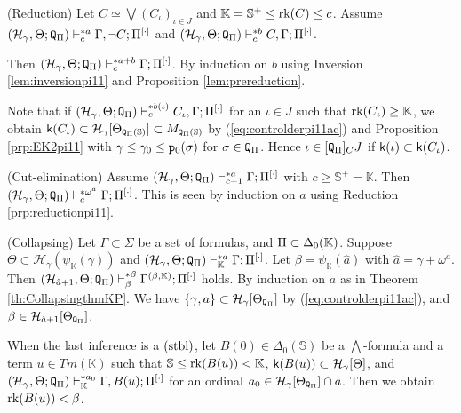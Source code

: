 \documentclass{article}
\newcommand{\mS}{\mathbb{S}}
\newcommand{\mK}{\mathbb{K}}
\begin{document}
\bprp\label{prp:reductionpi11}{\rm (Reduction)}
Let $C\simeq\bigvee(C_{\iota})_{\iota\in J}$ and
$\mK=\mS^{+}\leq\mbox{{\rm rk}}(C)\leq c$.
Assume
$(\mathcal{H}_{\gamma},\Theta;{\tt Q}_{\Pi})\vdash^{* a}_{c}\Gamma,\lnot C;\Pi^{[\cdot]}$
and
$(\mathcal{H}_{\gamma},\Theta;{\tt Q}_{\Pi})\vdash^{* b}_{c}C,\Gamma;\Pi^{[\cdot]}$.

Then
$(\mathcal{H}_{\gamma},\Theta;{\tt Q}_{\Pi})\vdash^{* a+b}_{c}\Gamma;\Pi^{[\cdot]}$.
\eprp
\bprf
By induction on $b$ using
Inversion \ref{lem:inversionpi11} and Proposition \ref{lem:prereduction}.

Note that if $(\mathcal{H}_{\gamma},\Theta;{\tt Q}_{\Pi})\vdash^{* b(\iota)}_{c}C_{\iota},\Gamma;\Pi^{[\cdot]}$ for an $\iota\in J$ such that $\rk(C_{\iota})\geq\mK$,
we obtain 
$\sfk(C_{\iota})\subset\calh_{\gam}[\Tht_{{\tt Q}_{\Pi}(\mS)}]\subset M_{{\tt Q}_{\Pi}(\mS)}$ by (\ref{eq:controlderpi11ac}) and Proposition \ref{prp:EK2pi11}
with $\gamma\leq\gamma_{0}\leq {\tt p}_{0}(\sigma)$ for $\sigma\in{\tt Q}_{\Pi}$.
Hence 
$\iota\in[{\tt Q}_{\Pi}]_{C}J$ if ${\sf k}(\iota)\subset{\sf k}(C_{\iota})$.
\eprf



\bprp\label{lem:predcepi11*}{\rm (Cut-elimination)}
Assume
$(\mathcal{H}_{\gamma},\Theta;{\tt Q}_{\Pi})\vdash^{* a}_{c+1}\Gamma;\Pi^{[\cdot]}$
with $c\geq\mS^{+}=\mK$.
Then $(\mathcal{H}_{\gamma},\Theta;{\tt Q}_{\Pi})\vdash^{* \omega^{a}}_{c}\Gamma;\Pi^{[\cdot]}$.
\eprp
\bprf
This is seen by induction on $a$
using Reduction \ref{prp:reductionpi11}.
\eprf


\blem\label{lem:Kcollpase.1}{\rm (Collapsing)}
Let
$\Gamma\subset\Sigma$ be a set of formulas, and $\Pi\subset\Del_{0}(\mK)$.
Suppose
$\Theta\subset
\mathcal{H}_{\gamma}(\psi_{\mK}(\gamma))$
 and
$
(\mathcal{H}_{\gamma},\Theta;{\tt Q}_{\Pi}
)\vdash^{* a}_{\mK}\Gamma;\Pi^{[\cdot]}
$.
Let
$\beta=\psi_{\mK}(\hat{a})$ with $\hat{a}=\gamma+\omega^{a}$.
Then 
$(\mathcal{H}_{\hat{a}+1},\Theta;{\tt Q}_{\Pi})
\vdash^{* \beta}_{\beta}
\Gamma^{(\beta,\mK)};\Pi^{[\cdot]}$ holds.
\elem
\bprf
By induction on $a$ as in Theorem \ref{th:CollapsingthmKP}.
We have 
$\{\gamma, a\}\subset\mathcal{H}_{\gamma}[\Theta_{{\tt Q}_{\Pi}}]$ by (\ref{eq:controlderpi11ac}),
and
$\beta\in\mathcal{H}_{\hat{a}+1}[\Theta_{{\tt Q}_{\Pi}}]$.

When the last inference is a $({\rm stbl})$, let
$B(0)\in\Delta_{0}(\mathbb{S})$ be a $\bigwedge$-formula
and a term $u\in Tm(\mK)$ such that
$\mS\leq{\rm rk}(B(u))<\mathbb{K}$,
${\sf k}(B(u))\subset \mathcal{H}_{\gamma}[\Theta]$,
and
$
(\mathcal{H}_{\gamma},\Theta;{\tt Q}_{\Pi}
)\vdash^{* a_{0}}_{\mK}
\Gamma, B(u);\Pi^{[\cdot]}
$ for an ordinal $a_{0}\in\mathcal{H}_{\gamma}[\Theta_{{\tt Q}_{\Pi}}]\cap a$.
Then we obtain
${\rm rk}(B(u))<\beta$.
\end{document}
